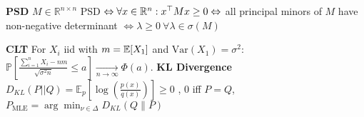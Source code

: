 \textbf{PSD}
$M \in \mathbb{R}^{n\times n}$ PSD $\Leftrightarrow \forall x \in \mathbb{R}^n: x^\top Mx \geq 0 \\
\Leftrightarrow$ all principal minors of $M$ have non-negative determinant $\Leftrightarrow \lambda \geq 0 \ \forall \lambda\in\sigma(M)$

\textbf{CLT} For $X_i$ iid with $m = \mathbb{E}[X_1]$ and $\text{Var}(X_1) = \sigma^2$: $\mathbb{P}\left[\frac{\sum_{i=1}^n X_i - n m}{\sqrt{\sigma^2 n}} \leq a\right] \xrightarrow[n \to \infty]{} \Phi(a)$.
\textbf{KL Divergence} $D_{KL}(P||Q) = \mathbb{E}_p[\log(\frac{p(x)}{q(x)})] \geq 0$ , 0 iff $P = Q$, $P_{\text{MLE}} = \arg \min_{\nu \in \Delta} D_{KL}(Q \parallel P)$

